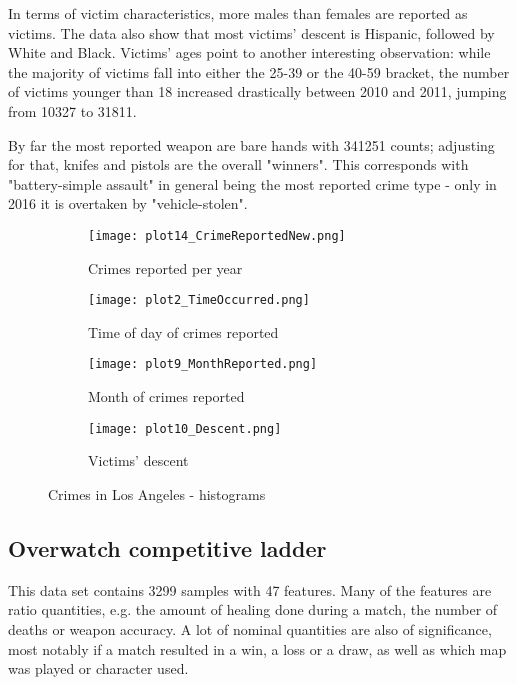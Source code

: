 \documentclass{article}
\begin{document}
In terms of victim characteristics, more males than females are reported as victims.
The data also show that most victims' descent is Hispanic, followed by White and Black.
Victims' ages point to another interesting observation: while the majority of victims fall into either the 25-39 or the 40-59 bracket, the number of victims younger than 18 increased drastically between 2010 and 2011, jumping from 10327 to 31811.

By far the most reported weapon are bare hands with 341251 counts; adjusting for that, knifes and pistols are the overall "winners".
This corresponds with "battery-simple assault" in general being the most reported crime type - only in 2016 it is overtaken by "vehicle-stolen".

\begin{figure}[h]
\centering
\begin{subfigure}[b]{0.45\textwidth}
\texttt{[image: plot14\_CrimeReportedNew.png]}
\caption{Crimes reported per year}
\label{fig:crpy}
\end{subfigure}
\begin{subfigure}[b]{0.45\textwidth}
\texttt{[image: plot2\_TimeOccurred.png]}
\caption{Time of day of crimes reported}
\label{fig:crtod}
\end{subfigure}
    
\begin{subfigure}[b]{0.45\textwidth}
\texttt{[image: plot9\_MonthReported.png]}
\caption{Month of crimes reported}
\label{fig:crmo}
\end{subfigure}
\begin{subfigure}[b]{0.45\textwidth}
\texttt{[image: plot10\_Descent.png]}
\caption{Victims' descent}
\label{fig:vi_de}
\end{subfigure}
\caption{Crimes in Los Angeles - histograms}\label{fig:clah}
\end{figure}

\subsection*{Overwatch competitive ladder}
This data set contains 3299 samples with 47 features.
Many of the features are ratio quantities, e.g. the amount of healing done during a match, the number of deaths or weapon accuracy.
A lot of nominal quantities are also of significance, most notably if a match resulted in a win, a loss or a draw, as well as which map was played or character used.
\end{document}
